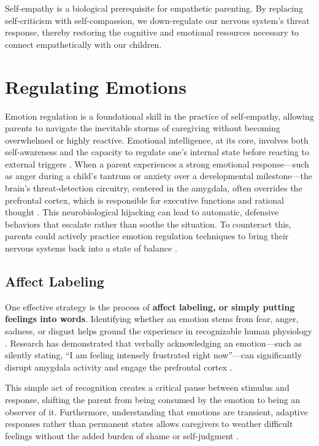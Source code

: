 \begin{keyinsight}
Self-empathy is a biological prerequisite for empathetic parenting.
By replacing self-criticism with self-compassion, we down-regulate our nervous system's threat response, thereby restoring the cognitive and emotional resources necessary to connect empathetically with our children.
\end{keyinsight}

\section{Regulating Emotions}
Emotion regulation is a foundational skill in the practice of self-empathy, allowing parents to navigate the inevitable storms of caregiving without becoming overwhelmed or highly reactive.
Emotional intelligence, at its core, involves both self-awareness and the capacity to regulate one's internal state before reacting to external triggers \citep{goleman1995}.
When a parent experiences a strong emotional response---such as anger during a child's tantrum or anxiety over a developmental milestone---the brain's threat-detection circuitry, centered in the amygdala, often overrides the prefrontal cortex, which is responsible for executive functions and rational thought \citep{damasio1994}.
This neurobiological hijacking can lead to automatic, defensive behaviors that escalate rather than soothe the situation.
To counteract this, parents could actively practice emotion regulation techniques to bring their nervous systems back into a state of balance \citep{porges2011}.

\subsection{Affect Labeling}
One effective strategy is the process of \textbf{affect labeling, or simply putting feelings into words}.
Identifying whether an emotion stems from fear, anger, sadness, or disgust helps ground the experience in recognizable human physiology \citep{ekman1992}.
Research has demonstrated that verbally acknowledging an emotion---such as silently stating, ``I am feeling intensely frustrated right now''---can significantly disrupt amygdala activity and engage the prefrontal cortex \citep{lieberman2007}.

This simple act of recognition creates a critical pause between stimulus and response, shifting the parent from being consumed by the emotion to being an observer of it.
Furthermore, understanding that emotions are transient, adaptive responses rather than permanent states allows caregivers to weather difficult feelings without the added burden of shame or self-judgment \citep{lazarus1991}.

